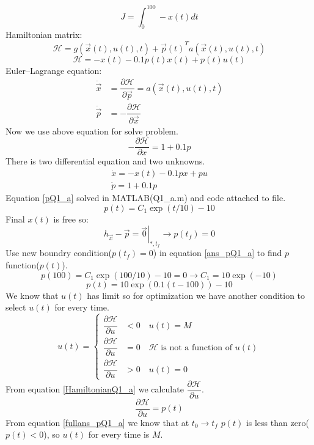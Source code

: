 $$J = \int_0^{100}-x(t)dt$$
Hamiltonian matrix:
$$\mathcal{H} =  g(\vec x(t), u(t), t) + {\vec{p}(t)}^Ta(\vec x(t), u(t), t)$$
\begin{equation} \label{HamiltonianQ1_a}
\mathcal{H} = -x(t) -0.1p(t)x(t)+p(t)u(t)
\end{equation}
Euler–Lagrange equation:
\begin{align}
\dot{\vec{x}} &= \dfrac{\partial \mathcal{H} }{\partial \vec{p}} = a(\vec x(t), u(t), t)\\
\dot{\vec{p}} &= -\dfrac{\partial \mathcal{H} }{\partial \vec{x}}
\end{align}
Now we use above equation for solve problem.
$$-\dfrac{\partial \mathcal{H} }{\partial x} = 1 + 0.1p$$
There is two differential equation and two unknowns.
\begin{align}
\dot x = -x(t) -0.1px+pu\\
\dot p = 1 + 0.1p\label{pQ1_a}
\end{align}
Equation \ref{pQ1_a} solved in MATLAB(Q1\_a.m) and code attached to file.
\begin{equation} \label{ans_pQ1_a}
p(t) = C_1\exp(t/10) - 10
\end{equation}
Final $x(t)$ is free so:
$$ \left .h_{\vec x} - \vec{p} = \vec{0} \right \vert_{*, t_f} \to p(t_f) = 0$$
Use new boundry condition($p(t_f) = 0$) in equation \ref{ans_pQ1_a} to find $p$ function($p(t)$).
$$p(100) = C_1\exp(100/10) - 10  = 0\to C_1 = 10\exp(-10)$$
\begin{equation} \label{fullans_pQ1_a}
p(t) = 10\exp \left(0.1(t-100)\right)-10
\end{equation}
We know that $u(t)$ has limit so for optimization we have another condition to select $u(t)$ for every time.
\begin{equation} \label{HConditionQ1_a}
u(t) = 
  \begin{cases}
	\dfrac{\partial \mathcal{H} }{\partial u}  & < 0\quad u(t) = M\\[10pt]
	\dfrac{\partial \mathcal{H} }{\partial u}  & = 0\quad  \mathcal{H} \text{ is not a function of }u(t) \\[10pt]
	\dfrac{\partial \mathcal{H} }{\partial u}  & > 0 \quad u(t) = 0
  \end{cases}
\end{equation}
From equation \ref{HamiltonianQ1_a} we calculate $\dfrac{\partial \mathcal{H} }{\partial u}$.
$$\dfrac{\partial \mathcal{H} }{\partial u} = p(t)$$
From equation \ref{fullans_pQ1_a} we know that at $t_0 \to t_f$ $p(t)$ is less than zero($p(t) < 0$), so $u(t)$ for every time is $M$.
